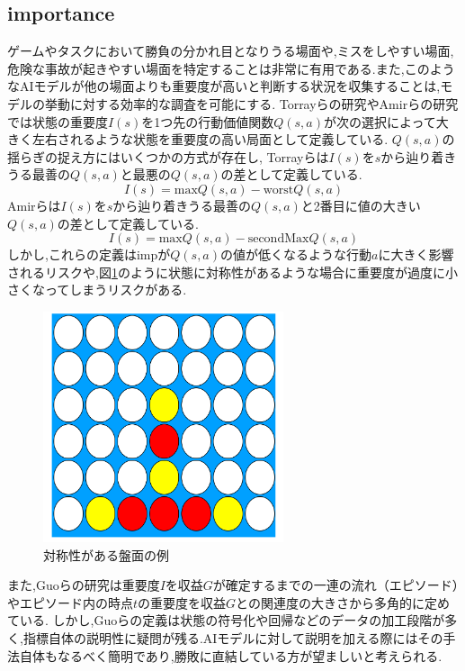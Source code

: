 \subsection{importance}
ゲームやタスクにおいて勝負の分かれ目となりうる場面や,ミスをしやすい場面,危険な事故が起きやすい場面を特定することは非常に有用である.また,このようなAIモデルが他の場面よりも重要度が高いと判断する状況を収集することは,モデルの挙動に対する効率的な調査を可能にする.
Torrayらの研究\cite{imp2013}やAmirらの研究\cite{imp2016}では状態の重要度$I(s)$を1つ先の行動価値関数$Q(s, a)$が次の選択によって大きく左右されるような状態を重要度の高い局面として定義している.
$Q(s, a)$の揺らぎの捉え方にはいくつかの方式が存在し,
Torrayらは$I(s)$を$s$から辿り着きうる最善の$Q(s, a)$と最悪の$Q(s, a)$の差として定義している.
\begin{equation}
	{I(s)= \textrm{max}Q(s, a)-\textrm{worst}Q(s, a)}
\end{equation}
Amirらは$I(s)$を$s$から辿り着きうる最善の$Q(s, a)$と2番目に値の大きい$Q(s, a)$の差として定義している.
\begin{equation}
    \label{imp}
	{I(s)= \textrm{max}Q(s, a)-\textrm{secondMax}Q(s, a)}
\end{equation}
しかし,これらの定義はimpが$Q(s, a)$の値が低くなるような行動$a$に大きく影響されるリスクや,図\ref{fig:symmetry}のように状態に対称性があるような場合に重要度が過度に小さくなってしまうリスクがある.
\begin{figure}[t]
	\centering
	\includegraphics[width=200pt]{./figure/symmetry.png}
	\caption{対称性がある盤面の例}
	\label{fig:symmetry}
\end{figure}
また,Guoらの研究\cite{EDGE}は重要度$I$を収益$G$が確定するまでの一連の流れ（エピソード）やエピソード内の時点$t$の重要度を収益$G$との関連度の大きさから多角的に定めている.
しかし,Guoらの定義は状態の符号化や回帰などのデータの加工段階が多く,指標自体の説明性に疑問が残る.AIモデルに対して説明を加える際にはその手法自体もなるべく簡明であり,勝敗に直結している方が望ましいと考えられる.





